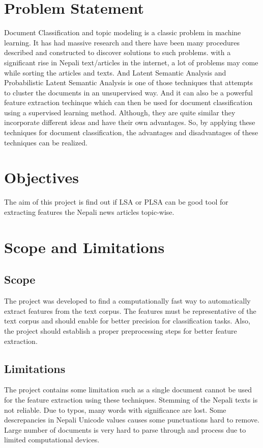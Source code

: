 \documentclass[12pt]{report}
\begin{document}
    \section{Problem Statement}
        Document Classification and topic modeling is a classic problem in machine learning. It has had massive research and there have been many procedures described and
        constructed to discover solutions to such problems. with a significant rise in Nepali text/articles in the internet, a lot of problems may come 
        while sorting the articles and texts. And Latent Semantic Analysis and Probabilistic Latent Semantic Analysis is one of those techniques that attempts 
        to cluster the documents in an unsupervised way. And it can also be a powerful feature extraction techinque which can then be used for document classification using a 
        supervised learning method. Although, they are quite similar they incorporate different ideas and have their own advantages. So, by applying these techniques for document classification, 
        the advantages and disadvantages of these techniques can be realized. 
    
    \section{Objectives}
        The aim of this project is find out if LSA or PLSA can be good tool for extracting features the Nepali news articles topic-wise.

    
    \section{Scope and Limitations}
        
        \subsection{Scope}
        The project was developed to find a computationally fast way to automatically extract features from the text corpus. 
        The features must be representative of the text corpus and should enable for better precision for classification tasks. 
        Also, the project should establish a proper preprocessing steps for better feature extraction.

        \subsection{Limitations}
        The project contains some limitation such as a single document cannot be used for the feature extraction using these techniques.
        Stemming of the Nepali texts is not reliable. Due to typos, many words with significance are lost. Some descrepancies in Nepali Unicode values 
        causes some punctuations hard to remove. Large number of documents is very hard to parse through and process due to limited computational devices.
\end{document}
